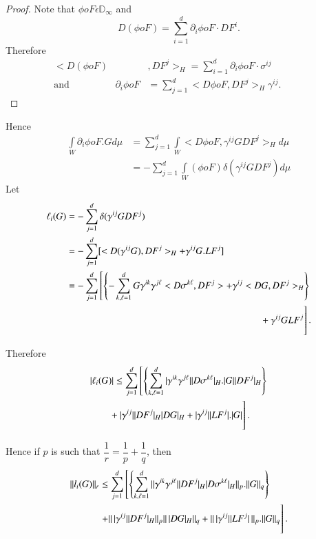 \begin{proof}
Note that $\phi o F \epsilon  \mathbb{D}_\infty $ and
$$
D(\phi oF)= \sum^{d}_{i=1}\partial_i \phi oF\cdot DF^i.
$$
Therefore 
\begin{align*}
   < D(\phi oF)&,  DF^j >_H=\sum^{d}_{i=1}\partial_i \phi oF \cdot \sigma^{ij}\\
  \text{and}\hspace{2cm}
  \partial_i \phi oF &= \sum^{d}_{j=1}< D \phi oF, DF^j >_H
  \gamma^{ij}.\hspace{1cm}\tag*{$\Box$} 
\end{align*}
\end{proof}

Hence\pageoriginale
\begin{align*}
  \int \limits _W \partial_i \phi o F. G d\mu &= \sum^d_{j=1}\int
  \limits_W < D\phi o F, \gamma^{ij} GDF^j >_H d \mu \\ 
  &= -\sum^d_{j=1}\int\limits_W (\phi o F) \delta(\gamma^{ij} GDF^j) d\mu
\end{align*}
Let
\begin{align*}
  \ell_i (G)  &= -\sum^d_{j=1} \delta (\gamma^{ij}GDF^j) \\
  & = -\sum^d_{j=1}[ < D (\gamma^{ij}G), DF^j >_H+\gamma^{ij}G. LF^j]\\
  & = -\sum^d_{j=1} \left[\left\{ -\sum^d_{k, \ell =1} G \gamma^{ik} \gamma^{j\ell }
    < D \sigma^{k\ell}, DF^j > + \gamma^{ij} < DG, DF^j >_H
    \right\}\right.\\ 
    & \hspace{7cm} \left. \vphantom{\sum^d_{k, \ell =1}}+ \gamma^{ij}
    GLF^j\right].  
\end{align*}

Therefore
\begin{multline*}
| \ell_i (G) | \leq \sum^d_{j=1} \left[ \left\{ \sum^d_{k, \ell=1} | \gamma^{ik}
  \gamma^{j\ell} || D \sigma^{k\ell} |_H. | G | | DF^j |_H \right\}\right.\\ 
  \left. \vphantom{\sum^d_{j=1}}+ |\gamma^{ij} | | DF^j |_H | DG |_H +
  | \gamma^{ij} | | LF^j | . | G |\right]. 
\end{multline*}

Hence if $p$ is such that $\dfrac{1}{r} = \dfrac{1}{p} + \dfrac{1}{q}$, then 
\begin{align*}
|| l_i (G) ||_r &\le \sum^d_{j=1}\left[ \left\{\sum^d_{k, \ell=1}|| \gamma^{ik}
  \gamma^{j\ell} || DF^{j}|_H | D \sigma^{k\ell} |_H ||_p.||G||_q
  \right\}\right. \\ 
  & \left. +|| \,|\gamma^{ij}|| DF^{j}|_H ||_p ||\, |DG|_H ||_q 
  \vphantom{\sum^d_{j=1}} +||\, |\gamma^{ij}|| LF^{j}|\, ||_p .||
  G ||_q \right]. 
\end{align*}


